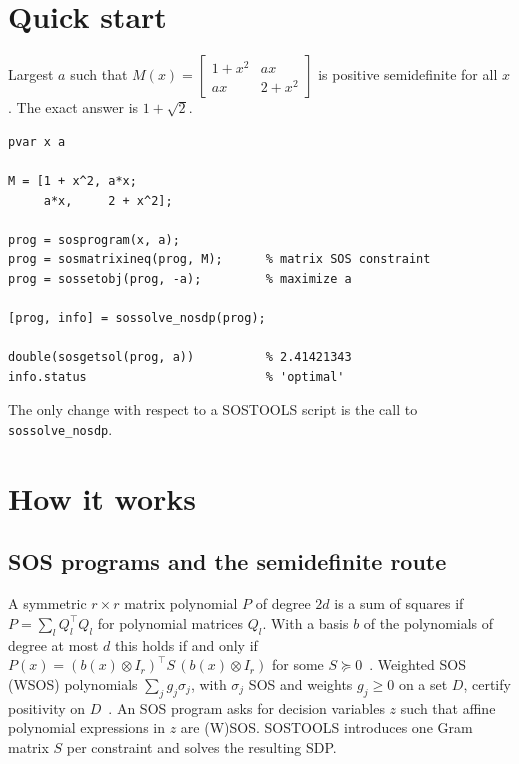 \documentclass[11pt,a4paper]{article}
\newcommand{\code}[1]{\texttt{#1}}
\begin{document}
\section{Quick start}\label{sec:quick}
Largest $a$ such that $M(x)=\begin{bmatrix}1+x^2&ax\\ax&2+x^2\end{bmatrix}$ is positive semidefinite for all $x$. The exact answer is $1+\sqrt2$.
\begin{lstlisting}
pvar x a

M = [1 + x^2, a*x;
     a*x,     2 + x^2];

prog = sosprogram(x, a);
prog = sosmatrixineq(prog, M);      % matrix SOS constraint
prog = sossetobj(prog, -a);         % maximize a

[prog, info] = sossolve_nosdp(prog);

double(sosgetsol(prog, a))          % 2.41421343
info.status                         % 'optimal'
\end{lstlisting}
The only change with respect to a SOSTOOLS script is the call to \code{sossolve\_nosdp}.

\section{How it works}\label{sec:how}
\subsection{SOS programs and the semidefinite route}
A symmetric $r\times r$ matrix polynomial $P$ of degree $2d$ is a sum of squares if $P=\sum_lQ_l^\top Q_l$ for polynomial matrices $Q_l$. With a basis $b$ of the polynomials of degree at most $d$ this holds if and only if $P(x)=(b(x)\otimes I_r)^\top S\,(b(x)\otimes I_r)$ for some $S\succeq0$~\cite{Nesterov2000,ShererHol2006}. Weighted SOS (WSOS) polynomials $\sum_jg_j\sigma_j$, with $\sigma_j$ SOS and weights $g_j\ge0$ on a set $D$, certify positivity on $D$~\cite{ShererHol2006}. An SOS program asks for decision variables $z$ such that affine polynomial expressions in $z$ are (W)SOS. SOSTOOLS introduces one Gram matrix $S$ per constraint and solves the resulting SDP.
\end{document}
